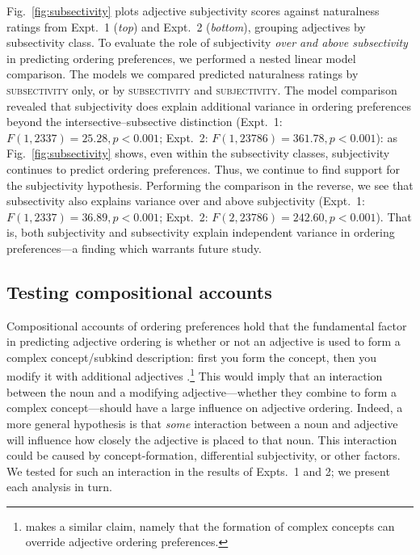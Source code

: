 \documentclass[12pt]{article}
\newcommand{\jd}[1]{\textcolor{red}{[jd: #1]}}
\begin{document}
Fig.~\ref{fig:subsectivity} plots adjective subjectivity scores against naturalness ratings from Expt.~1 (\emph{top}) and Expt.~2 (\emph{bottom}), grouping adjectives by subsectivity class. To evaluate the role of subjectivity \emph{over and above subsectivity} in predicting ordering preferences, we performed a nested linear model comparison. The models  %
we compared predicted naturalness ratings by \textsc{subsectivity} only, or by \textsc{subsectivity} and \textsc{subjectivity}. The model comparison revealed that subjectivity does explain additional variance in ordering preferences beyond the intersective--subsective distinction (Expt.~1: $F(1,2337)=25.28, p<0.001$; Expt.~2: $F(1,23786)=361.78, p<0.001$): as Fig.~\ref{fig:subsectivity} shows, even within the subsectivity classes, subjectivity continues to predict ordering preferences. Thus, we continue to find support for the subjectivity hypothesis.  Performing the comparison in the reverse, we see that subsectivity also explains variance over and above subjectivity (Expt.~1: $F(1,2337)=36.89, p<0.001$; Expt.~2: $F(2,23786)=242.60, p<0.001$). That is, both subjectivity and subsectivity explain independent variance in ordering preferences---a finding which warrants future study.


\subsection{Testing compositional accounts}

Compositional accounts of ordering preferences hold that the fundamental factor in predicting adjective ordering is whether or not an adjective is used to form a complex concept/subkind description: first you form the concept, then you modify it with additional adjectives \citep{McNally2004,svenonius2008}.\footnote{\cite{bouchard2005} makes a similar claim, namely that the formation of complex concepts can override adjective ordering preferences.} 
This would imply that an interaction between the noun and a modifying adjective---whether they combine to form a complex concept---should have a large influence on adjective ordering. 
Indeed, a more general hypothesis is that \emph{some} interaction between a noun and adjective will influence how closely the adjective is placed to that noun. This interaction could be caused by concept-formation, differential subjectivity, or other factors. We tested for such an interaction in the results of Expts.~1 and 2; we present each analysis in turn.
\end{document}
